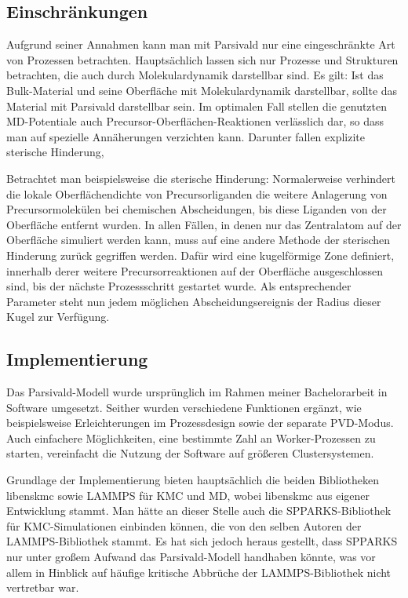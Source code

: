 
\subsection{Einschränkungen}

Aufgrund seiner Annahmen kann man mit Parsivald nur eine eingeschränkte Art von Prozessen betrachten.
Hauptsächlich lassen sich nur Prozesse und Strukturen betrachten, die auch durch Molekulardynamik darstellbar sind.
Es gilt: Ist das Bulk-Material und seine Oberfläche mit Molekulardynamik darstellbar, sollte das Material mit Parsivald darstellbar sein.
Im optimalen Fall stellen die genutzten MD-Potentiale auch Precursor-Oberflächen-Reaktionen verlässlich dar, so dass man auf spezielle Annäherungen verzichten kann.
Darunter fallen explizite sterische Hinderung, 


Betrachtet man beispielsweise die sterische Hinderung:
Normalerweise verhindert die lokale Oberflächendichte von Precursorliganden die weitere Anlagerung von Precursormolekülen bei chemischen Abscheidungen, bis diese Liganden von der Oberfläche entfernt wurden.
In allen Fällen, in denen nur das Zentralatom auf der Oberfläche simuliert werden kann, muss auf eine andere Methode der sterischen Hinderung zurück gegriffen werden.
Dafür wird eine kugelförmige Zone definiert, innerhalb derer weitere Precursorreaktionen auf der Oberfläche ausgeschlossen sind, bis der nächste Prozessschritt gestartet wurde.
Als entsprechender Parameter steht nun jedem möglichen Abscheidungsereignis der Radius dieser Kugel zur Verfügung.



\subsection{Implementierung}

Das Parsivald-Modell wurde ursprünglich im Rahmen meiner Bachelorarbeit  in Software umgesetzt.
Seither wurden verschiedene Funktionen ergänzt, wie beispielsweise Erleichterungen im Prozessdesign sowie der separate PVD-Modus. Auch einfachere Möglichkeiten, eine bestimmte Zahl an Worker-Prozessen zu starten, vereinfacht die Nutzung der Software auf größeren Clustersystemen.

Grundlage der Implementierung bieten hauptsächlich die beiden Bibliotheken libenskmc sowie LAMMPS für KMC und MD, wobei libenskmc aus eigener Entwicklung stammt.
Man hätte an dieser Stelle auch die SPPARKS-Bibliothek für KMC-Simulationen einbinden können, die von den selben Autoren der LAMMPS-Bibliothek stammt. Es hat sich jedoch heraus gestellt, dass SPPARKS nur unter großem Aufwand das Parsivald-Modell handhaben könnte, was vor allem in Hinblick auf häufige kritische Abbrüche der LAMMPS-Bibliothek nicht vertretbar war.

